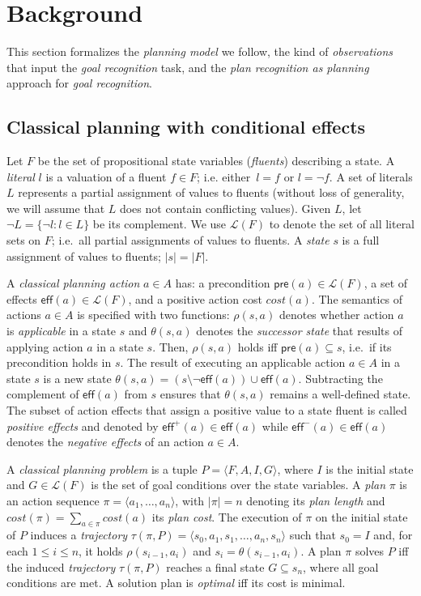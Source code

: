 \documentclass{article}
\newcommand{\tup}[1]{{\langle #1 \rangle}}
\newcommand{\pre}{\mathsf{pre}}     %
\newcommand{\eff}{\mathsf{eff}}     %
\begin{document}
\section{Background}
\label{sec:background}
This section formalizes the {\em planning model} we follow, the kind of {\em observations} that input the {\em goal recognition} task, and the {\em plan recognition as planning} approach for {\em goal recognition}.  

\subsection{Classical planning with conditional effects}
Let $F$ be the set of  propositional state variables ({\em fluents}) describing a state. A {\em literal} $l$ is a valuation of a fluent $f\in F$; i.e. either~$l=f$ or $l=\neg f$. A set of literals $L$ represents a partial assignment of values to fluents (without loss of generality, we will assume that $L$ does not contain conflicting values). Given $L$, let $\neg L=\{\neg l:l\in L\}$ be its complement. We use $\mathcal{L}(F)$ to denote the set of all literal sets on $F$; i.e.~all partial assignments of values to fluents. A {\em state} $s$ is a full assignment of values to fluents; $|s|=|F|$.

A {\em classical planning action} $a\in A$ has: a precondition $\pre(a)\in\mathcal{L}(F)$, a set of effects $\eff(a)\in\mathcal{L}(F)$, and a positive action cost $cost(a)$. The semantics of actions $a\in A$ is specified with two functions: $\rho(s,a)$ denotes whether action $a$ is {\em applicable} in a state $s$ and $\theta(s,a)$ denotes the {\em successor state} that results of applying action $a$ in a state $s$. Then, $\rho(s,a)$ holds iff $\pre(a)\subseteq s$, i.e.~if its precondition holds in $s$. The result of executing an applicable action $a\in A$ in a state $s$ is a new state $\theta(s,a)=(s\setminus \neg\eff(a))\cup\eff(a)$. Subtracting the complement of $\eff(a)$ from $s$ ensures that $\theta(s,a)$ remains a well-defined state. The subset of action effects that assign a positive value to a state fluent is called {\em positive effects} and denoted by $\eff^+(a)\in \eff(a)$ while $\eff^-(a)\in \eff(a)$ denotes the {\em negative effects} of an action $a\in A$.

A {\em classical planning problem} is a tuple $P=\tup{F,A,I,G}$, where $I$ is the initial state and $G\in\mathcal{L}(F)$ is the set of goal conditions over the state variables. A {\em plan} $\pi$ is an action sequence $\pi=\tup{a_1, \ldots, a_n}$, with $|\pi|=n$ denoting its {\em plan length} and $cost(\pi)=\sum_{a\in\pi} cost(a)$ its {\em plan cost}. The execution of $\pi$ on the initial state of $P$ induces a {\em trajectory} $\tau(\pi,P)=\tup{s_0, a_1, s_1, \ldots, a_n, s_n}$ such that $s_0=I$ and, for each {\small $1\leq i\leq n$}, it holds $\rho(s_{i-1},a_i)$ and $s_i=\theta(s_{i-1},a_i)$. A plan $\pi$ solves $P$ iff the induced {\em trajectory} $\tau(\pi,P)$ reaches a final state $G \subseteq s_n$, where all goal conditions are met. A solution plan is {\em optimal} iff its cost is minimal.
\end{document}

